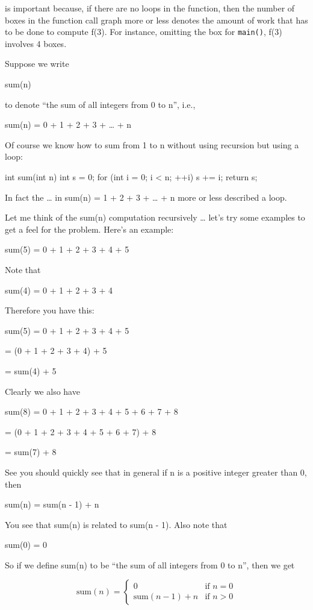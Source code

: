 is important because, if there are no loops in the function, then the
number of boxes in the function call graph more or less denotes the
amount of work that has to be done to compute f(3). For instance,
omitting the box for \texttt{main()}, f(3) involves 4 boxes.


\newpage{}

Suppose we write

sum(n)

to denote ``the sum of all integers from 0 to n'', i.e.,

sum(n) = 0 + 1 + 2 + 3 + \ldots{} + n

Of course we know how to sum from 1 to n without using recursion but
using a loop:

\begin{consolethree}[escapeinside=||]
int sum(int n)
{
    int s = 0;
    for (int i = 0; i < n; ++i)
    {
        s += i;
    }
    return s;
}
\end{consolethree}

In fact the \ldots{} in sum(n) = 1 + 2 + 3 + \ldots{} + n more or less described a loop.

Let me think of the sum(n) computation recursively \ldots{} let's try
some examples to get a feel for the problem. Here's an
example:

sum(5) = 0 + 1 + 2 + 3 + 4 + 5

Note that

sum(4) = 0 + 1 + 2 + 3 + 4

Therefore you have this:

sum(5) = 0 + 1 + 2 + 3 + 4 + 5

= (0 + 1 + 2 + 3 + 4) + 5

= sum(4) + 5

Clearly we also have

sum(8) = 0 + 1 + 2 + 3 + 4 + 5 + 6 + 7 + 8

= (0 + 1 + 2 + 3 + 4 + 5 + 6 + 7) + 8

= sum(7) + 8

See you should quickly see that in general if n is a positive integer
greater than 0, then

sum(n) = sum(n - 1) + n

You see that sum(n) is related to sum(n - 1). Also note that

sum(0) = 0

So if we define sum(n) to be ``the sum of all integers from 0 to n'',
then we get

\[
\text{sum}(n) = \begin{cases}
0 & \text{if } n = 0 \\
\text{sum}(n - 1) + n & \text{if } n > 0
\end{cases}
\]

